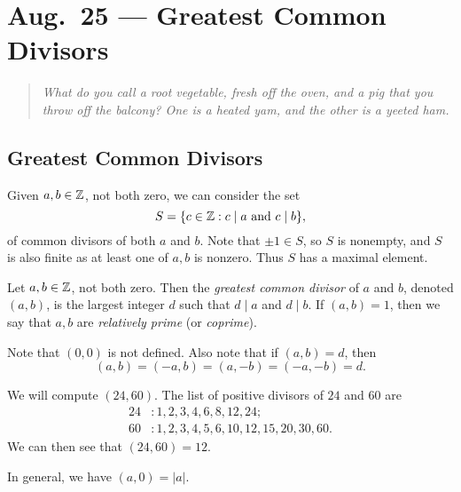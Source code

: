 \chapter{Aug.~25 --- Greatest Common Divisors}

\begin{quote}
  \emph{What do you call a root vegetable, fresh off the oven, and a pig that you throw off the balcony? One is a heated yam, and the other is a yeeted ham.}
\end{quote}

\section{Greatest Common Divisors}

\begin{remark}
  Given $a, b \in \mathbb{Z}$, not both zero,
  we can
  consider the set
  \[S = \{c \in \mathbb{Z} : c \mid a \text{ and } c \mid b\},\]
  of common divisors of both $a$ and $b$.
  Note that $\pm 1 \in S$, so $S$ is
  nonempty, and $S$ is also finite as
  at least one of $a, b$ is nonzero.
  Thus $S$ has a maximal element.
\end{remark}

\begin{definition}
  Let $a, b \in \mathbb{Z}$, not both zero. Then
  the \emph{greatest common divisor}
  of $a$ and $b$, denoted $(a, b)$,
  is the largest integer $d$ such that
  $d \mid a$ and $d \mid b$.
  If $(a, b) = 1$, then we say that
  $a, b$ are \emph{relatively prime} (or
  \emph{coprime}).
\end{definition}

\begin{remark}
  Note that $(0, 0)$ is not defined.
  Also note that if $(a, b) = d$, then
  \[
    (a, b) = (-a, b) = (a, -b)
    = (-a, -b) = d.
  \]
\end{remark}

\begin{example}
  We will compute $(24, 60)$. The
  list of positive divisors of $24$ and
  $60$ are
  \begin{align*}
    24 &: 1, 2, 3, 4, 6, 8, 12, 24; \\
    60 &: 1, 2, 3, 4, 5, 6, 10, 12, 15, 20, 30, 60.
  \end{align*}
  We can then see that $(24, 60) = 12$.
\end{example}

\begin{remark}
  In general, we have $(a, 0) = |a|$.
\end{remark}

